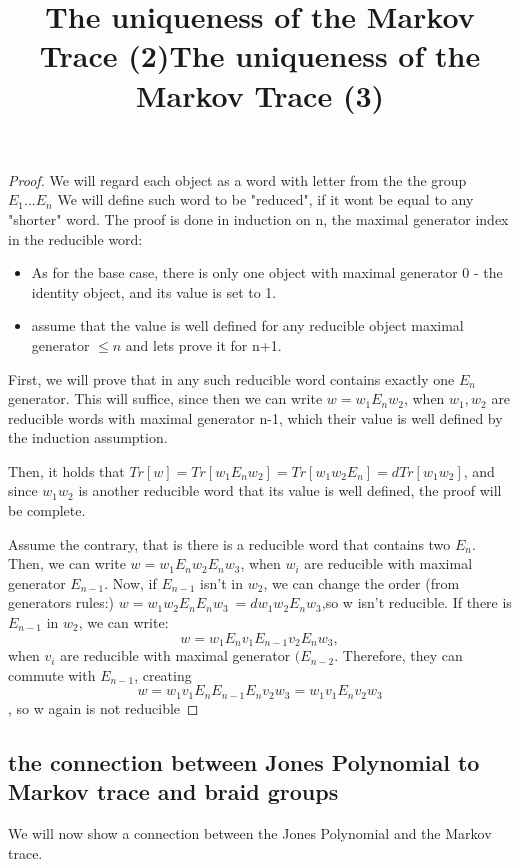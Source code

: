 \documentclass{article}
\begin{document}
\begin{proof}
We will regard each object as a word with letter from the the group $E_{1}...E_{n}$
We will define such word to be "reduced", if it wont be equal to any "shorter" word.
The proof is done in induction on n, the maximal generator index in the reducible word:
\begin{itemize}
\item As for the base case, there is only one object with maximal generator 0 - the identity object, and its value is set to 1.
\item assume that the value is well defined for any reducible object maximal generator $\leq n$ and lets prove it for n+1. 
\end{itemize}


\title{The uniqueness of the Markov Trace (2)}
First, we will prove that in any such reducible word contains exactly one $E_{n}$ generator.
This will suffice, since then we can write $w=w_{1}E_{n}w_{2}$, when $w_{1}, w_{2}$ are
reducible words with maximal generator n-1, which their value is well defined by the induction assumption.

Then, it holds that $Tr[w]=Tr[w_{1}E_{n}w_{2}] = Tr[w_{1}w_{2}E_{n}] = dTr[w_{1}w_{2}]$, and
since $w_{1}w_{2}$ is another reducible word that its value is well defined, the proof will be complete.   


\title{The uniqueness of the Markov Trace (3)}
Assume the contrary, that is there is a reducible word that contains two $E_{n}$.
Then, we can write $w=w_{1}E_{n}w_{2}E_{n}w_{3}$, when $w_{i}$ are reducible with maximal generator
$E_{n-1}$. Now, if $E_{n-1}$ isn't in $w_{2}$, we can change the order (from generators rules:)
$w=w_{1}w_{2}E_{n}E_{n}w_{3}\ = dw_{1}w_{2}E_{n}w_{3}$,so w isn't reducible.
If there is $E_{n-1}$ in  $w_{2}$, we can write:
\begin{displaymath}
 w=w_{1}E_{n}v_{1}E_{n-1}v_{2}E_{n}w_{3},
 \end{displaymath} 
 when 
 $v_{i}$  are reducible with maximal generator
$(E_{n-2}$. Therefore, they can commute with $E_{n-1}$, creating 
\begin{displaymath}
w=w_{1}v_{1}E_{n}E_{n-1}E_{n}v_{2}w_{3}
= w_{1}v_{1}E_{n}v_{2}w_{3}
 \end{displaymath} 
 , so w again is not reducible
   
\end{proof}






\subsection{the connection between Jones Polynomial to Markov trace and braid groups}
We will now show a connection between the Jones Polynomial and the Markov trace.
\end{document}
